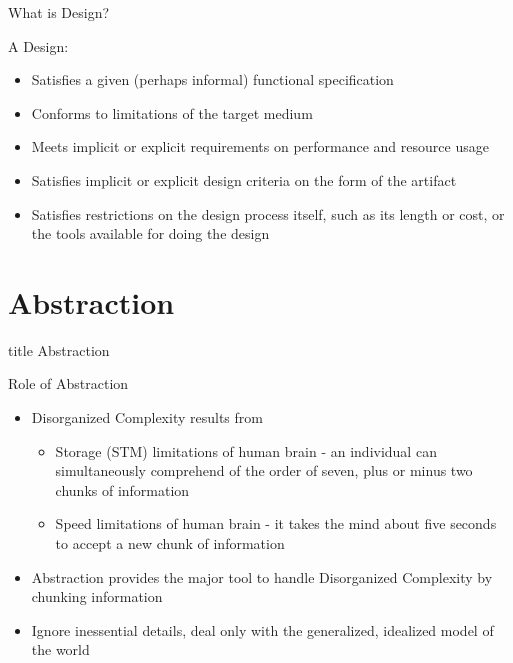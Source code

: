 \documentclass[aspectratio=169, xcolor=dvipsnames]{beamer}
\begin{document}
\begin{frame}{What is Design?}
    \begin{block}{A Design:}
        \begin{itemize}[<+->]
            \item Satisfies a given (perhaps informal) functional specification
            \item Conforms to limitations of the target medium
            \item Meets implicit or explicit requirements on performance and resource usage
            \item Satisfies implicit or explicit design criteria on the form of the artifact
            \item Satisfies restrictions on the design process itself, such as its length or cost, or the tools available for doing the design
        \end{itemize}
    \end{block}
\end{frame}

\section{Abstraction}
\begin{frame}
  \vfill
  \centering
  \begin{beamercolorbox}[sep=8pt,center,shadow=true,rounded=true]{title}
    Abstraction\par%
  \end{beamercolorbox}
  \vfill
\end{frame}

\begin{frame}{Role of Abstraction}
    \begin{itemize}[<+->]
        \item Disorganized Complexity results from
        \begin{itemize}
            \item[$\triangleright$] Storage (STM) limitations of human brain - an individual can simultaneously comprehend of the order of seven, plus or minus two chunks of information
            \item[$\triangleright$] Speed limitations of human brain - it takes the mind about five seconds to accept a new chunk of information
        \end{itemize}
        \item Abstraction provides the major tool to handle Disorganized Complexity by chunking information
        \item Ignore inessential details, deal only with the generalized, idealized model of the world
    \end{itemize}
\end{frame}
\end{document}

